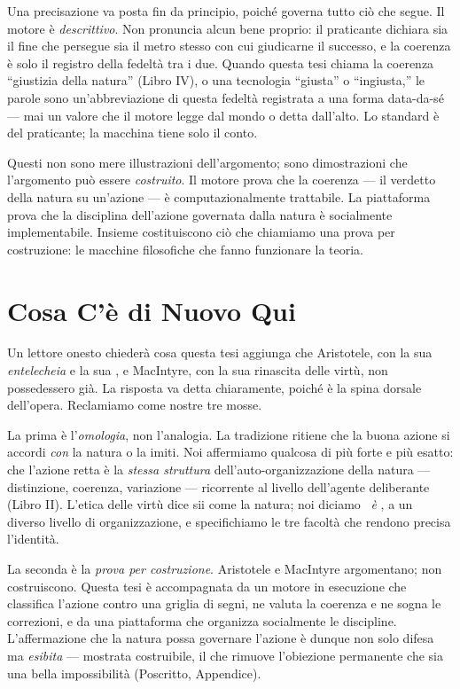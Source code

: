 Una precisazione va posta fin da principio, poich\'e governa tutto ci\`o che segue.
Il motore \`e \emph{descrittivo}. Non pronuncia alcun bene proprio: il praticante
dichiara sia il fine che persegue sia il metro stesso con cui giudicarne il successo,
e la coerenza \`e solo il registro della fedelt\`a tra i due. Quando questa tesi
chiama la coerenza ``giustizia della natura'' (Libro IV), o una tecnologia
``giusta'' o ``ingiusta,'' le parole sono un'abbreviazione di questa fedelt\`a
registrata a una forma data-da-s\'e --- mai un valore che il motore legge dal mondo o
detta dall'alto. Lo standard \`e del praticante; la macchina tiene solo il conto.

Questi non sono mere illustrazioni dell'argomento; sono dimostrazioni che
l'argomento pu\`o essere \emph{costruito}. Il motore prova che la coerenza
--- il verdetto della natura su un'azione --- \`e computazionalmente
trattabile. La piattaforma prova che la disciplina dell'azione governata
dalla natura \`e socialmente implementabile. Insieme costituiscono ci\`o
che chiamiamo una prova per costruzione: le macchine filosofiche che fanno
funzionare la teoria.

\section{Cosa C'\`e di Nuovo Qui}

Un lettore onesto chieder\`a cosa questa tesi aggiunga che Aristotele, con la sua
\emph{entelecheia} e la sua \praxis, e MacIntyre, con la sua rinascita delle
virt\`u, non possedessero gi\`a. La risposta va detta chiaramente, poich\'e \`e la
spina dorsale dell'opera. Reclamiamo come nostre tre mosse.

La prima \`e l'\emph{omologia}, non l'analogia. La tradizione ritiene che la buona
azione si accordi \emph{con} la natura o la imiti. Noi affermiamo qualcosa di
pi\`u forte e pi\`u esatto: che l'azione retta \`e la \emph{stessa struttura}
dell'auto-organizzazione della natura --- distinzione, coerenza, variazione ---
ricorrente al livello dell'agente deliberante (Libro II). L'etica delle virt\`u
dice sii come la natura; noi diciamo \praxis\ \emph{\`e} \physis, a un diverso
livello di organizzazione, e specifichiamo le tre facolt\`a che rendono precisa
l'identit\`a.

La seconda \`e la \emph{prova per costruzione}. Aristotele e MacIntyre
argomentano; non costruiscono. Questa tesi \`e accompagnata da un motore in
esecuzione che classifica l'azione contro una griglia di segni, ne valuta la
coerenza e ne sogna le correzioni, e da una piattaforma che organizza socialmente
le discipline. L'affermazione che la natura possa governare l'azione \`e dunque
non solo difesa ma \emph{esibita} --- mostrata costruibile, il che rimuove
l'obiezione permanente che sia una bella impossibilit\`a (Poscritto, Appendice).

